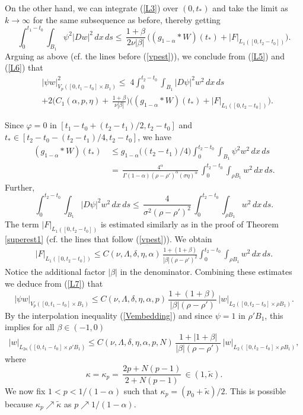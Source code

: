 \documentclass[10pt]{article}
\begin{document}
On the other hand, we can integrate (\ref{L3}) over $(0,t_*)$ and
take the limit as $k\to \infty$ for the same subsequence as
before, thereby getting
\begin{equation} \label{L6}
\int_{0}^{t_1-t_0}\!\!\!\int_{B_1}
\psi^2|Dw|^2\,dx\,ds\le\,\frac{1+\beta}{2\nu
|\beta|}\,\Big((g_{1-\alpha}\ast
W)(t_*)+|F|_{L_1([0,t_2-t_0])}\Big).
\end{equation}
Arguing as above (cf. the lines before (\ref{vpest})), we conclude
from (\ref{L5}) and (\ref{L6}) that
\begin{align}
&|\psi w|^2_{V_p([0,t_1-t_0]\times B_1)}\le \;
4\int_{0}^{t_2-t_0}\int_{B_1} |D\psi|^2w^2\,dx\,ds\nonumber\\
&+2\Big(C_1(\alpha,p,\eta)+\,\frac{1+\beta}{\nu|\beta|}\Big)
\Big((g_{1-\alpha}\ast W)(t_*)+|F|_{L_1([0,t_2-t_0])}\Big).
\label{L7}
\end{align}

Since $\varphi=0$ in $[t_1-t_0+(t_2-t_1)/2,t_2-t_0]$ and
$t_*\in[t_2-t_0-(t_2-t_1)/4,t_2-t_0]$, we have
\begin{align*}
(g_{1-\alpha}\ast W)(t_*)&\,\le
g_{1-\alpha}\big((t_2-t_1)/4\big)\int_0^{t_2-t_0} \!\!\!\int_{
B_1}\psi^2w^2\,dx\,d{s}\\
&\,=\,\frac{4^\alpha}{\Gamma(1-\alpha)(\rho-\rho')^\alpha(\sigma\eta)^\alpha}\,
\int_0^{t_2-t_0} \!\!\!\int_{\rho B_1}w^2\,dx\,d{s}.
\end{align*}
Further,
\[
 \int_{0}^{t_2-t_0}\int_{B_1} |D\psi|^2w^2\,dx\,ds\le\,\frac{4}{\sigma^2(\rho-\rho')^2}
 \,\int_0^{t_2-t_0}
\!\!\!\int_{\rho B_1}w^2\,dx\,d{s}.
\]
The term $|F|_{L_1([0,t_2-t_0])}$ is estimated similarly as in the
proof of Theorem \ref{superest1} (cf. the lines that follow
(\ref{vpest})). We obtain
\begin{align*}
|F|_{L_1([0,t_2-t_0])}\le
C(\nu,\Lambda,\delta,\eta,\alpha)\,\frac{1+(1+\beta)}{|\beta|(\rho-\rho')^2}
\int_0^{t_2-t_0} \!\!\!\int_{\rho B_1}w^2\,dx\,ds.
\end{align*}
Notice the additional factor $|\beta|$ in the denominator.
Combining these estimates we deduce from (\ref{L7}) that
\[
|\psi w|_{V_p([0,t_1-t_0]\times B_1)}\le
C(\nu,\Lambda,\delta,\eta,\alpha,p)\,\frac{1+(1+\beta)}
{|\beta|(\rho-\rho')}\, |w|_{L_{2}([0,t_2-t_0]\times\rho B_1)}.
\]
By the interpolation inequality (\ref{Vembedding}) and since
$\psi=1$ in $\rho'B_1$, this implies for all $\beta\in(-1,0)$
\begin{equation} \label{supL8}
|w|_{L_{2\kappa}([0,t_1-t_0]\times \rho'B_1)}\le
C(\nu,\Lambda,\delta,\eta,\alpha,p,N)\,\frac{1+|1+\beta|}{|\beta|(\rho-\rho')}
\,|w|_{L_{2}([0,t_2-t_0]\times \rho B_1)},
\end{equation}
where
\[
\kappa=\kappa_p=\,\frac{2p+N(p-1)}{2+N(p-1)}\,\in
(1,\tilde{\kappa}).
\]
We now fix $1<p<1/(1-\alpha)$ such that
$\kappa_p=(p_0+\tilde{\kappa})/2$. This is possible because
$\kappa_p\nearrow \tilde{\kappa}$ as $p \nearrow 1/(1-\alpha)$.
\end{document}
